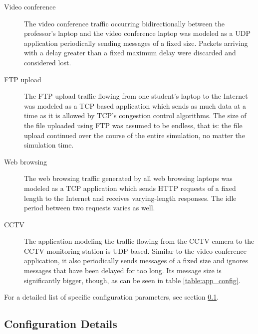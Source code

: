 \documentclass[
10pt, %
a4paper, %
oneside, %
headinclude,footinclude, %
BCOR5mm, %
]{scrartcl}
\begin{document}
\begin{description}
\item[Video conference] The video conference traffic occurring bidirectionally between the professor's laptop and the video conference laptop was modeled as a UDP application periodically sending messages of a fixed size. Packets arriving with a delay greater than a fixed maximum delay were discarded and considered lost.
\item[FTP upload] The FTP upload traffic flowing from one student's laptop to the Internet was modeled as a TCP based application which sends as much data at a time as it is allowed by TCP's congestion control algorithms.
The size of the file uploaded using FTP was assumed to be endless, that is: the file upload continued over the course of the entire simulation, no matter the simulation time.
\item[Web browsing] The web browsing traffic generated by all web browsing laptops was modeled as a TCP application which sends HTTP requests of a fixed length to the Internet and receives varying-length responses. The idle period between two requests varies as well.
\item[CCTV] The application modeling the traffic flowing from the CCTV camera to the CCTV monitoring station is UDP-based. Similar to the video conference application, it also periodically sends messages of a fixed size and ignores messages that have been delayed for too long. Its message size is significantly bigger, though, as can be seen in table \ref{table:app_config}.
\end{description}

For a detailed list of specific configuration parameters, see section \ref{sec:conf_details}.

\subsection{Configuration Details}
\label{sec:conf_details}
\end{document}
